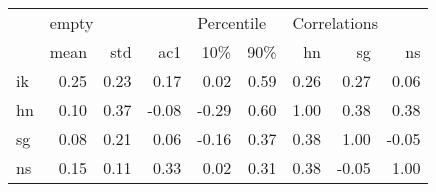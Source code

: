 \begin{tabular}{lrrrrrrrr}
\toprule
{} & \multicolumn{3}{l}{empty} & \multicolumn{2}{l}{Percentile} & \multicolumn{3}{l}{Correlations} \\
{} &  mean &   std &   ac1 &        10\% &   90\% &           hn &    sg &    ns \\
\midrule
ik &  0.25 &  0.23 &  0.17 &       0.02 &  0.59 &         0.26 &  0.27 &  0.06 \\
hn &  0.10 &  0.37 & -0.08 &      -0.29 &  0.60 &         1.00 &  0.38 &  0.38 \\
sg &  0.08 &  0.21 &  0.06 &      -0.16 &  0.37 &         0.38 &  1.00 & -0.05 \\
ns &  0.15 &  0.11 &  0.33 &       0.02 &  0.31 &         0.38 & -0.05 &  1.00 \\
\bottomrule
\end{tabular}
